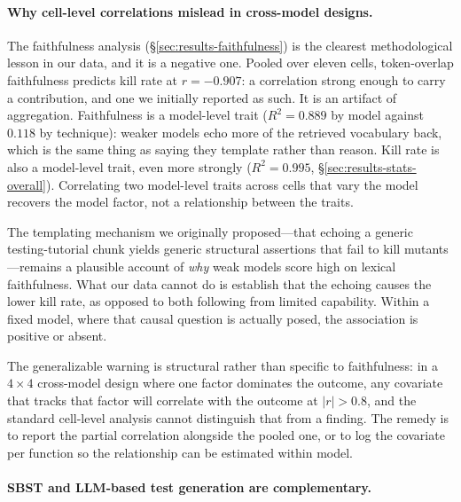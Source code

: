 \documentclass[smallextended]{svjour3}
\begin{document}
\paragraph{Why cell-level correlations mislead in cross-model
designs.}\label{sec:discussion-faithfulness}

The faithfulness analysis (\S\ref{sec:results-faithfulness}) is the
clearest methodological lesson in our data, and it is a negative
one. Pooled over eleven cells, token-overlap faithfulness predicts
kill rate at $r = -0.907$: a correlation strong enough to carry a
contribution, and one we initially reported as such. It is an
artifact of aggregation. Faithfulness is a model-level trait
($R^2 = 0.889$ by model against $0.118$ by technique): weaker models
echo more of the retrieved vocabulary back, which is the same thing
as saying they template rather than reason. Kill rate is also a
model-level trait, even more strongly
($R^2 = 0.995$, \S\ref{sec:results-stats-overall}). Correlating two
model-level traits across cells that vary the model recovers the
model factor, not a relationship between the traits.

The templating mechanism we originally proposed---that echoing a
generic testing-tutorial chunk yields generic structural assertions
that fail to kill mutants---remains a plausible account of
\emph{why} weak models score high on lexical faithfulness. What our
data cannot do is establish that the echoing causes the lower kill
rate, as opposed to both following from limited capability. Within
a fixed model, where that causal question is actually posed, the
association is positive or absent.

The generalizable warning is structural rather than specific to
faithfulness: in a $4 \times 4$ cross-model design where one factor
dominates the outcome, any covariate that tracks that factor will
correlate with the outcome at $|r| > 0.8$, and the standard
cell-level analysis cannot distinguish that from a finding. The
remedy is to report the partial correlation alongside the pooled
one, or to log the covariate per function so the relationship can be
estimated within model.

\paragraph{SBST and LLM-based test generation are complementary.}
\label{sec:discussion-sbst}
\end{document}
